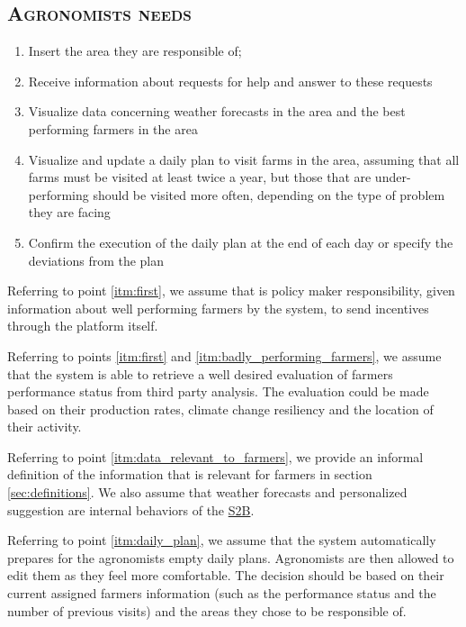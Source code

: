 \subsection*{\textsc{\textcolor{myblue}{Agronomists needs}}}
\label{sec:agronomistsNeeds}
    \begin{enumerate}[resume]
        \item Insert the area they are responsible of;
        \item Receive information about requests for help and answer to these requests
        \item Visualize data concerning weather forecasts in the area and the best performing farmers in the area
        \item \label{itm:daily_plan} Visualize and update a daily plan to visit farms in the area, assuming that all farms must be visited at least twice a year, but those that are under-performing should be visited more often, depending on the type of problem they are facing
        \item Confirm the execution of the daily plan at the end of each day or specify the deviations from the plan
    \end{enumerate}

Referring to point \ref{itm:first}, we assume that is policy maker responsibility, given information about well performing farmers by the system, to send incentives through the platform itself. 
\newline

Referring to points \ref{itm:first} and \ref{itm:badly_performing_farmers}, we assume that the system is able to retrieve a well desired evaluation of farmers performance status from third party analysis. The evaluation could be made based on their production rates, climate change resiliency and the location of their activity.
\newline

Referring to point \ref{itm:data_relevant_to_farmers}, we provide an informal definition of the information that is relevant for farmers in section \ref{sec:definitions}. We also assume that weather forecasts and personalized suggestion are internal behaviors of the \hyperref[tab:acronymsTable]{S2B}.
\newline

Referring to point \ref{itm:daily_plan}, we assume that the system automatically prepares for the agronomists empty daily plans. Agronomists are then allowed to edit them as they feel more comfortable.
The decision should be based on their current assigned farmers information (such as the performance status and the number of previous visits) and the areas they chose to be responsible of.
\newline

